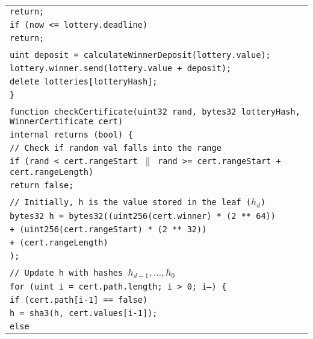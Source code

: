 \documentclass[a4paper]{article}
\begin{document}
\begin{tabularx}{\linewidth}{l}
        \qquad\qquad\qquad\texttt{return;}\\
        \qquad\qquad\texttt{if (now <= lottery.deadline)}\\
        \qquad\qquad\qquad\texttt{return;}\\
        \\
        \qquad\qquad\texttt{uint deposit = calculateWinnerDeposit(lottery.value);}\\
        \qquad\qquad\texttt{lottery.winner.send(lottery.value + deposit);}\\
        \qquad\qquad\texttt{delete lotteries[lotteryHash];}\\
        \qquad\texttt{\}}\\
        \\
        \qquad\texttt{function checkCertificate(uint32 rand, bytes32 lotteryHash, WinnerCertificate cert)}\\
        \qquad\qquad\qquad\qquad\qquad\qquad\qquad\qquad\texttt{internal returns (bool) \{}\\
        \qquad\qquad\texttt{// Check if~random val falls into~the~range}\\
        \qquad\qquad\texttt{if (rand < cert.rangeStart $\|$ rand >= cert.rangeStart + cert.rangeLength)}\\
        \qquad\qquad\qquad\texttt{return false;}\\
        \\
        \qquad\qquad\texttt{// Initially, h is~the~value stored in~the~leaf ($h_d$)}\\
        \qquad\qquad\texttt{bytes32 h = bytes32((uint256(cert.winner) * (2 ** 64))}\\
        \qquad\qquad\qquad\qquad\qquad\qquad\texttt{+ (uint256(cert.rangeStart) * (2 ** 32))}\\
        \qquad\qquad\qquad\qquad\qquad\qquad\texttt{+ (cert.rangeLength)}\\
        \qquad\qquad\qquad\qquad\qquad\texttt{);}\\
        \\
        \qquad\qquad\texttt{// Update h with~hashes $h_{d-1}, \ldots, h_0$}\\
        \qquad\qquad\texttt{for (uint i = cert.path.length; i > 0; i--) \{}\\
        \qquad\qquad\qquad\texttt{if (cert.path[i-1] == false)}\\
        \qquad\qquad\qquad\qquad\texttt{h = sha3(h, cert.values[i-1]);}\\
        \qquad\qquad\qquad\texttt{else}\\

\end{tabularx}
\end{document}
